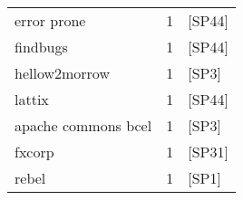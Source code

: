 \begin{tabular}{lrl}
         error prone &      1 &                                           [SP44] \\
            findbugs &      1 &                                           [SP44] \\
       hellow2morrow &      1 &                                            [SP3] \\
              lattix &      1 &                                           [SP44] \\
 apache commons bcel &      1 &                                            [SP3] \\
              fxcorp &      1 &                                           [SP31] \\
               rebel &      1 &                                            [SP1] \\
\bottomrule
\end{tabular}
